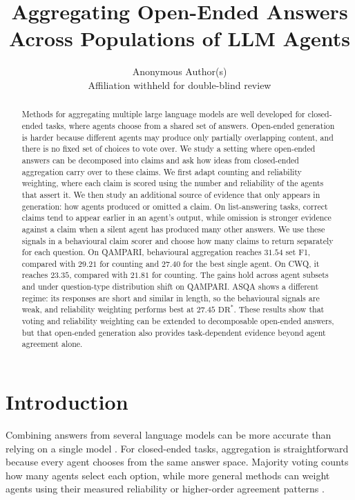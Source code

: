 \documentclass[11pt]{article}
\title{Aggregating Open-Ended Answers Across Populations of LLM Agents}
\author{%
  Anonymous Author(s) \\
  Affiliation withheld for double-blind review \\
}
\begin{document}
\maketitle

\begin{abstract}
Methods for aggregating multiple large language models are well developed for closed-ended tasks, where agents choose from a shared set of answers. Open-ended generation is harder because different agents may produce only partially overlapping content, and there is no fixed set of choices to vote over. We study a setting where open-ended answers can be decomposed into claims and ask how ideas from closed-ended aggregation carry over to these claims. We first adapt counting and reliability weighting, where each claim is scored using the number and reliability of the agents that assert it. We then study an additional source of evidence that only appears in generation: how agents produced or omitted a claim. On list-answering tasks, correct claims tend to appear earlier in an agent's output, while omission is stronger evidence against a claim when a silent agent has produced many other answers. We use these signals in a behavioural claim scorer and choose how many claims to return separately for each question. On QAMPARI, behavioural aggregation reaches $31.54$ set F1, compared with $29.21$ for counting and $27.40$ for the best single agent. On CWQ, it reaches $23.35$, compared with $21.81$ for counting. The gains hold across agent subsets and under question-type distribution shift on QAMPARI. ASQA shows a different regime: its responses are short and similar in length, so the behavioural signals are weak, and reliability weighting performs best at $27.45$ $\mathrm{DR}^*$. These results show that voting and reliability weighting can be extended to decomposable open-ended answers, but that open-ended generation also provides task-dependent evidence beyond agent agreement alone.
\end{abstract}

\section{Introduction}
\label{sec:intro}

Combining answers from several language models can be more accurate than relying on a single model \citep{li2024agents}. For closed-ended tasks, aggregation is straightforward because every agent chooses from the same answer space. Majority voting counts how many agents select each option, while more general methods can weight agents using their measured reliability or higher-order agreement patterns \citep{ai2025majority}.
\end{document}

